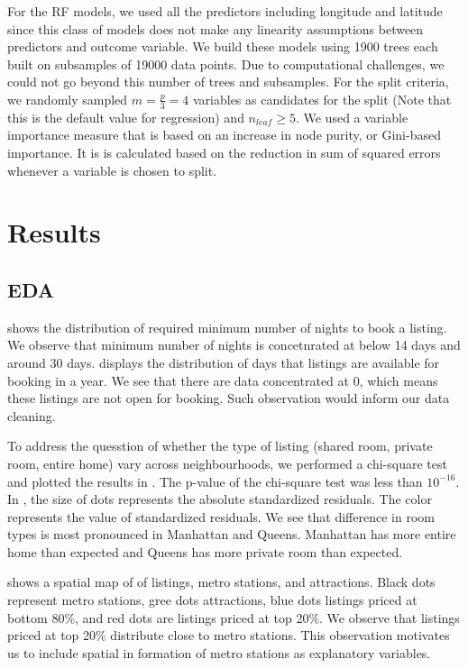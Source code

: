 \documentclass[10pt]{jmlr}%
\begin{document}
For the RF models, we used all the predictors including longitude and latitude since this class of models does not make any linearity assumptions between predictors and outcome variable. We build these models using 1900 trees each built on subsamples of 19000 data points. Due to computational challenges, we could not go beyond this number of trees and subsamples. For the split criteria, we randomly sampled $m = \frac{p}{3} = 4$ variables as candidates for the split (Note that this is the default value for regression) and $n_{leaf} \geq 5$. We used a variable importance measure that is based on an increase in node purity, or Gini-based importance. It is is calculated based on the reduction in sum of squared errors whenever a variable is chosen to split.


\section{Results}
\label{sec:results}

\subsection{EDA}

 shows the distribution of required minimum number of nights to book a listing. We observe that minimum number of nights is concetnrated at below 14 days and around 30 days.  displays the distribution of days that listings are available for booking in a year. We see that there are data concentrated at 0, which means these listings are not open for booking. Such observation would inform our data cleaning.

To address the quesstion of whether the type of listing (shared room, private room, entire home) vary across neighbourhoods, we performed a chi-square test and plotted the results in . The p-value of the chi-square test was less than $10^{-16}$. In , the size of dots represents the absolute standardized residuals. The color represents the value of standardized residuals. We see that difference in room types is most pronounced in Manhattan and Queens. Manhattan has more entire home than expected and Queens has more private room than expected.

 shows a spatial map of  of listings, metro stations, and attractions. Black dots represent metro stations, gree dots attractions, blue dots listings priced at bottom 80\%, and red dots are listings priced at top 20\%. We observe that listings priced at top 20\% distribute close to metro stations. This observation motivates us to include spatial in formation of metro stations as explanatory variables.
\end{document}
